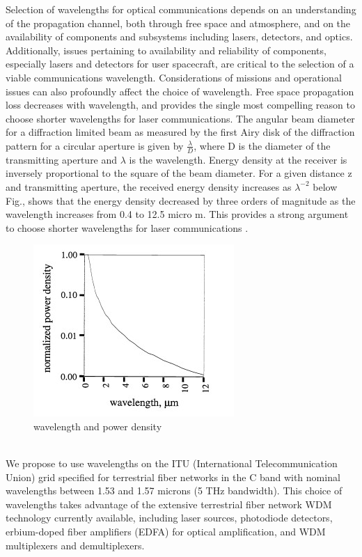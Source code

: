 Selection of wavelengths for optical communications depends on an understanding of the propagation channel, both through free space and atmosphere, and on the availability of components and subsystems including lasers, detectors, and optics. Additionally, issues pertaining to availability and reliability of components, especially lasers and detectors for user spacecraft, are critical to the selection of a viable communications wavelength. Considerations of missions and operational issues can also profoundly affect the choice of wavelength. Free space propagation loss decreases with wavelength, and provides the single most compelling reason to choose shorter wavelengths for laser communications. The angular beam diameter for a diffraction limited beam as measured by the first Airy disk of the diffraction pattern for a circular aperture is given by $\tfrac{\lambda}{D}$, where D is the diameter of the transmitting aperture and $\lambda$ is the wavelength. Energy density at the receiver is inversely proportional to the square of the beam diameter. For a given distance z and transmitting aperture, the received energy density increases as $\lambda^{-2}$ below Fig., shows that the energy density decreased by three orders of magnitude as the wavelength increases from 0.4 to 12.5 micro m. This provides a strong argument to choose shorter wavelengths for laser communications \cite{article:wavelength}.
\begin{figure}[htb]
\begin{center}
\includegraphics[width=0.7\columnwidth]{figures/laser-communication/bh4.jpg}
\caption{wavelength and power density}
\end{center}
\end{figure}
\\
We propose to use wavelengths on the ITU (International Telecommunication Union) grid specified for terrestrial fiber networks in the C band with nominal wavelengths between 1.53 and 1.57 microns (5 THz bandwidth). This choice of wavelengths takes advantage of the extensive terrestrial fiber network WDM technology currently available, including laser sources, photodiode detectors, erbium-doped fiber amplifiers (EDFA) for optical amplification, and WDM multiplexers and demultiplexers. 


